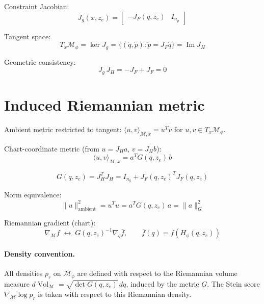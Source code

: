 \documentclass[11pt,a4paper]{article}
\DeclareMathOperator{\Image}{Im}
\DeclareMathOperator{\Vol}{Vol}
\newcommand{\Mphi}{\mathcal{M}_{\phi}}
\newcommand{\Mset}{\mathcal{M}}
\begin{document}
Constraint Jacobian:
\begin{equation}
J_g(x, z_e) = \begin{bmatrix} -J_F(q, z_e) & I_{n_p} \end{bmatrix}
\end{equation}

Tangent space:
\begin{equation}
T_x \Mphi = \ker J_g = \{ (\dot q, \dot p) : \dot p = J_F \dot q \} = \Image J_H
\end{equation}

Geometric consistency:
\begin{equation}
J_g \, J_H = -J_F + J_F = 0
\end{equation}

\section{Induced Riemannian metric}

Ambient metric restricted to tangent: $\langle u, v \rangle_{\Mset, x} = u^T v$ for $u, v \in T_x \Mphi$.

Chart-coordinate metric (from $u = J_H a$, $v = J_H b$):
\begin{equation}
\langle u, v \rangle_{\Mset, x} = a^T G(q, z_e) \, b
\end{equation}

\begin{equation}
\boxed{ G(q, z_e) = J_H^T J_H = I_{n_q} + J_F(q, z_e)^T J_F(q, z_e) }
\end{equation}

Norm equivalence:
\begin{equation}
\| u \|^2_{\text{ambient}} = u^T u = a^T G(q, z_e) \, a = \| a \|_G^2
\end{equation}

Riemannian gradient (chart):
\begin{equation}
\nabla_{\Mset} f \;\leftrightarrow\; G(q, z_e)^{-1} \nabla_q \bar{f}, \qquad \bar{f}(q) = f(H_\phi(q, z_e))
\end{equation}

\paragraph{Density convention.} All densities $p_r$ on $\Mphi$ are defined with respect to the Riemannian volume measure $d\Vol_{\Mset} = \sqrt{\det G(q, z_e)} \, dq$, induced by the metric $G$. The Stein score $\nabla_{\Mset} \log p_r$ is taken with respect to this Riemannian density.
\end{document}
